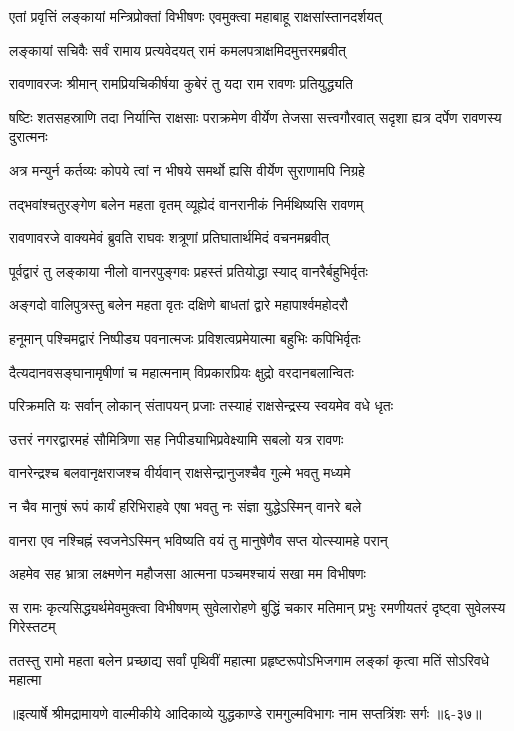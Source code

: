 \twolineshloka
{एतां प्रवृत्तिं लङ्कायां मन्त्रिप्रोक्तां विभीषणः}
{एवमुक्त्वा महाबाहू राक्षसांस्तानदर्शयत्} %

\twolineshloka
{लङ्कायां सचिवैः सर्वं रामाय प्रत्यवेदयत्}
{रामं कमलपत्राक्षमिदमुत्तरमब्रवीत्} %

\twolineshloka
{रावणावरजः श्रीमान् रामप्रियचिकीर्षया}
{कुबेरं तु यदा राम रावणः प्रतियुद्ध्यति} %

\threelineshloka
{षष्टिः शतसहस्राणि तदा निर्यान्ति राक्षसाः}
{पराक्रमेण वीर्येण तेजसा सत्त्वगौरवात्}
{सदृशा ह्यत्र दर्पेण रावणस्य दुरात्मनः} %

\twolineshloka
{अत्र मन्युर्न कर्तव्यः कोपये त्वां न भीषये}
{समर्थो ह्यसि वीर्येण सुराणामपि निग्रहे} %

\twolineshloka
{तद्भवांश्चतुरङ्गेण बलेन महता वृतम्}
{व्यूह्येदं वानरानीकं निर्मथिष्यसि रावणम्} %

\twolineshloka
{रावणावरजे वाक्यमेवं ब्रुवति राघवः}
{शत्रूणां प्रतिघातार्थमिदं वचनमब्रवीत्} %

\twolineshloka
{पूर्वद्वारं तु लङ्काया नीलो वानरपुङ्गवः}
{प्रहस्तं प्रतियोद्धा स्याद् वानरैर्बहुभिर्वृतः} %

\twolineshloka
{अङ्गदो वालिपुत्रस्तु बलेन महता वृतः}
{दक्षिणे बाधतां द्वारे महापार्श्वमहोदरौ} %

\twolineshloka
{हनूमान् पश्चिमद्वारं निष्पीड्य पवनात्मजः}
{प्रविशत्वप्रमेयात्मा बहुभिः कपिभिर्वृतः} %

\twolineshloka
{दैत्यदानवसङ्घानामृषीणां च महात्मनाम्}
{विप्रकारप्रियः क्षुद्रो वरदानबलान्वितः} %

\twolineshloka
{परिक्रमति यः सर्वान् लोकान् संतापयन् प्रजाः}
{तस्याहं राक्षसेन्द्रस्य स्वयमेव वधे धृतः} %

\twolineshloka
{उत्तरं नगरद्वारमहं सौमित्रिणा सह}
{निपीड्याभिप्रवेक्ष्यामि सबलो यत्र रावणः} %

\twolineshloka
{वानरेन्द्रश्च बलवानृक्षराजश्च वीर्यवान्}
{राक्षसेन्द्रानुजश्चैव गुल्मे भवतु मध्यमे} %

\twolineshloka
{न चैव मानुषं रूपं कार्यं हरिभिराहवे}
{एषा भवतु नः संज्ञा युद्धेऽस्मिन् वानरे बले} %

\twolineshloka
{वानरा एव नश्चिह्नं स्वजनेऽस्मिन् भविष्यति}
{वयं तु मानुषेणैव सप्त योत्स्यामहे परान्} %

\twolineshloka
{अहमेव सह भ्रात्रा लक्ष्मणेन महौजसा}
{आत्मना पञ्चमश्चायं सखा मम विभीषणः} %

\threelineshloka
{स रामः कृत्यसिद्ध्यर्थमेवमुक्त्वा विभीषणम्}
{सुवेलारोहणे बुद्धिं चकार मतिमान् प्रभुः}
{रमणीयतरं दृष्ट्वा सुवेलस्य गिरेस्तटम्} %

\twolineshloka
{ततस्तु रामो महता बलेन प्रच्छाद्य सर्वां पृथिवीं महात्मा}
{प्रहृष्टरूपोऽभिजगाम लङ्कां कृत्वा मतिं सोऽरिवधे महात्मा} %


॥इत्यार्षे श्रीमद्रामायणे वाल्मीकीये आदिकाव्ये युद्धकाण्डे रामगुल्मविभागः नाम सप्तत्रिंशः सर्गः ॥६-३७॥

